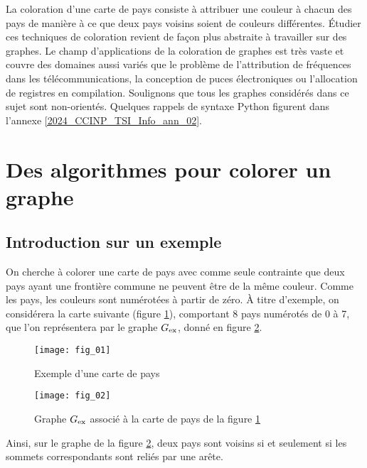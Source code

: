 
La coloration d'une carte de pays consiste à attribuer une couleur à chacun des pays de manière à ce que deux pays voisins soient de couleurs différentes.
Étudier ces techniques de coloration revient de façon plus abstraite à travailler sur des graphes.
Le champ d'applications de la coloration de graphes est très vaste et couvre des domaines aussi variés que le problème de l'attribution de fréquences dans les télécommunications, la conception de puces électroniques ou l'allocation de registres en compilation.
Soulignons que tous les graphes considérés dans ce sujet sont non-orientés. Quelques rappels de syntaxe Python figurent dans l'annexe \ref{2024_CCINP_TSI_Info_ann_02}.

\section{Des algorithmes pour colorer un graphe \label{2024_CCINP_TSI_Info_sec_01}}
\subsection{Introduction sur un exemple \label{2024_CCINP_TSI_Info_sec_01_1}}
On cherche à colorer une carte de pays avec comme seule contrainte que deux pays ayant une frontière commune ne peuvent être de la même couleur.
Comme les pays, les couleurs sont numérotées à partir de zéro.
À titre d'exemple, on considérera la carte suivante (figure \ref{2024_CCINP_TSI_Info_fig_01}), comportant 8 pays numérotés de 0 à 7, que l'on représentera par le graphe ${G}_{\text{ex}}$, donné en figure \ref{2024_CCINP_TSI_Info_fig_02}.

\begin{figure}[!h]
\centering
\texttt{[image: fig\_01]}
\caption{Exemple d'une carte de pays \label{2024_CCINP_TSI_Info_fig_01}}
\end{figure}

\begin{figure}[!h]
\centering
\texttt{[image: fig\_02]}
\caption{Graphe ${G}_{\text{ex}}$ associé à la carte de pays de la figure \ref{2024_CCINP_TSI_Info_fig_01}\label{2024_CCINP_TSI_Info_fig_02}}
\end{figure}

Ainsi, sur le graphe de la figure \ref{2024_CCINP_TSI_Info_fig_02}, deux pays sont voisins si et seulement si les sommets correspondants sont reliés par une arête.



